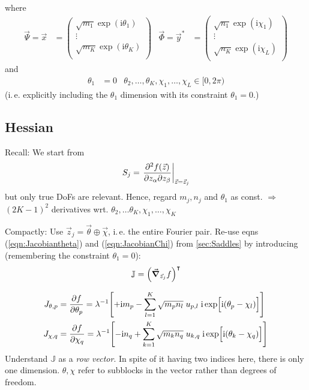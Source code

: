 \documentclass[
	english,
	a4paper,
	fontsize=10pt,
	parskip=half,
	titlepage=true,
	DIV=12,
	final
]{scrreprt}
\newcommand*{\ie}{i.\,e.\xspace}
\newcommand*{\Thus}{\ensuremath{\Rightarrow}\xspace}
\newcommand*{\transp}{\ensuremath{^\intercal}}
\newcommand*{\iunit}{\ensuremath{\mathrm{i}}}
\begin{document}
where
\begin{align}
	\vec{\Psi} =
	\vec{x}
	&= \begin{pmatrix}
		\sqrt{m_1} \exp(\iunit \theta_1) \\
		\vdots                           \\
		\sqrt{m_K} \exp(\iunit \theta_K) \\
	\end{pmatrix}
&
	\vec{\Phi} =
	\vec{y}^{*}
	&= \begin{pmatrix}
		\sqrt{n_1} \exp(\iunit \chi_1) \\
		\vdots                           \\
		\sqrt{n_K} \exp(\iunit \chi_L) \\
	\end{pmatrix}
\end{align}
and
\begin{align}
	\theta_1 &= 0
&
	\theta_2, \ldots, \theta_K, \chi_1, \ldots, \chi_L \in [0, 2\pi)
\end{align}
(\ie explicitly including the $\theta_1$ dimension with its constraint $\theta_1 = 0$.)

\subsection{Hessian}
Recall: We start from
\begin{align}
	S_j
=
	\eval{
		\pdv{f(\vec{z})}%
			{z_\alpha}{z_\beta}
	}_{\vec{z} = \vec{z}_j}
\end{align}
but only true DoFs are relevant. Hence, regard $m_j, n_j$ and $\theta_1$ as const. \newline
\Thus $(2K - 1)^{2}$ derivatives wrt. $\theta_2, \ldots \theta_K, \chi_1, \ldots, \chi_K$

Compactly: Use $\vec{z}_j = \vec{\theta} \oplus \vec{\chi}$, \ie the entire Fourier pair. Re-use eqns (\ref{eqn:Jacobiantheta}) and (\ref{eqn:JacobianChi}) from \ref{sec:Saddles} by introducing (remembering the constraint $\theta_1 = 0$):
\begin{align}
	\mathbb{J} = \qty( \grad_{\vec{z}_j} f )\transp
\end{align}

\begin{align}
	J_{\theta, p} 
&= 
	\pdv{f}{\theta_p}
=
	\lambda^{-1}
	\qty[
		+\iunit m_p
		-
		\sum_{l=1}^{K}
			\sqrt{m_p n_l} \; u_{p,l} \; \iunit \exp[\Big. \iunit(\theta_p - \chi_l)]
	]
\\
	J_{\chi, q} 
&= 
	\pdv{f}{\chi_q}
=
	\lambda^{-1}
	\qty[
		-\iunit n_q
		+
		\sum_{k=1}^{K}
			\sqrt{m_k n_q} \; u_{k,q} \; \iunit \exp[\Big. \iunit(\theta_k - \chi_q)]
	]
\end{align}
Understand $\mathbb{J}$ as a \emph{row vector}. In spite of it having two indices here, there is only one dimension. $\theta, \chi$ refer to subblocks in the vector rather than degrees of freedom.
\end{document}
